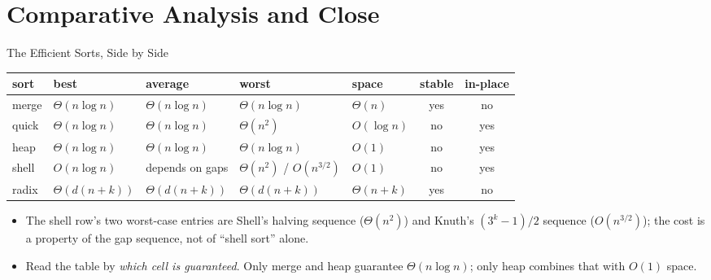 \documentclass[aspectratio=169]{beamer}
\begin{document}

\section{Comparative Analysis and Close}


\begin{frame}{The Efficient Sorts, Side by Side}
  \begin{center}
  {\scriptsize
  \begin{tabular}{l l l l l c c}
    \toprule
    \textbf{sort} & \textbf{best} & \textbf{average} & \textbf{worst} &
      \textbf{space} & \textbf{stable} & \textbf{in-place} \\
    \midrule
    merge & $\Theta(n\log n)$ & $\Theta(n\log n)$ & $\Theta(n\log n)$ &
      $\Theta(n)$ & yes & no \\
    quick & $\Theta(n\log n)$ & $\Theta(n\log n)$ & $\Theta(n^2)$ &
      $O(\log n)$ & no & yes \\
    heap & $\Theta(n\log n)$ & $\Theta(n\log n)$ & $\Theta(n\log n)$ &
      $O(1)$ & no & yes \\
    shell & $O(n\log n)$ & depends on gaps & $\Theta(n^2)$ / $O(n^{3/2})$ &
      $O(1)$ & no & yes \\
    radix & $\Theta(d(n+k))$ & $\Theta(d(n+k))$ & $\Theta(d(n+k))$ &
      $\Theta(n+k)$ & yes & no \\
    \bottomrule
  \end{tabular}}
  \end{center}
  \vspace{0.1cm}
  \begin{itemize}
    \item The shell row's two worst-case entries are Shell's halving sequence
      ($\Theta(n^2)$) and Knuth's $(3^k-1)/2$ sequence ($O(n^{3/2})$); the
      cost is a property of the gap sequence, not of ``shell sort'' alone.
    \item Read the table by \emph{which cell is guaranteed}. Only merge and
      heap guarantee $\Theta(n\log n)$; only heap combines that with
      $O(1)$ space.
  \end{itemize}
\end{frame}
\end{document}
